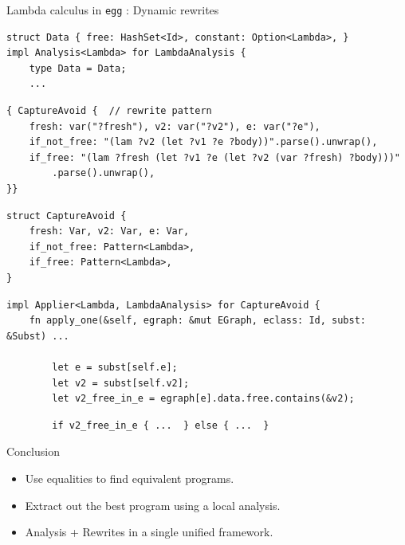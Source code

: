 \documentclass[8pt]{beamer}
\newcommand{\egg}{\texttt{egg} }
\begin{document}
\begin{frame}[fragile]{Lambda calculus in  \egg: Dynamic rewrites}
\begin{verbatim}
struct Data { free: HashSet<Id>, constant: Option<Lambda>, }
impl Analysis<Lambda> for LambdaAnalysis {
    type Data = Data;
    ...
\end{verbatim}
\pause
\begin{verbatim}
{ CaptureAvoid {  // rewrite pattern
    fresh: var("?fresh"), v2: var("?v2"), e: var("?e"),
    if_not_free: "(lam ?v2 (let ?v1 ?e ?body))".parse().unwrap(),
    if_free: "(lam ?fresh (let ?v1 ?e (let ?v2 (var ?fresh) ?body)))"
        .parse().unwrap(),
}}
\end{verbatim}
\pause
\begin{verbatim}
struct CaptureAvoid {
    fresh: Var, v2: Var, e: Var,
    if_not_free: Pattern<Lambda>,
    if_free: Pattern<Lambda>,
}
\end{verbatim}
\pause
\begin{verbatim}
impl Applier<Lambda, LambdaAnalysis> for CaptureAvoid {
    fn apply_one(&self, egraph: &mut EGraph, eclass: Id, subst: &Subst) ...

        let e = subst[self.e];
        let v2 = subst[self.v2];
        let v2_free_in_e = egraph[e].data.free.contains(&v2);
\end{verbatim}
\pause
\begin{verbatim}
        if v2_free_in_e { ...  } else { ...  }
\end{verbatim}
\end{frame}


\begin{frame}{Conclusion}
\begin{itemize}
\item Use equalities to find equivalent programs.
\item Extract out the best program using a local analysis.
\item Analysis + Rewrites in a single unified framework.
\end{itemize}
\end{frame}

\end{document}
